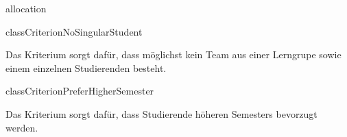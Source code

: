 \begin{texdocpackage}{allocation}
\begin{texdocclass}{class}{CriterionNoSingularStudent}
\label{texdoclet:allocation.CriterionNoSingularStudent}
\begin{texdocclassintro}
Das Kriterium sorgt dafür, dass möglichst kein Team aus einer Lerngrupe sowie
 einem einzelnen Studierenden besteht.\end{texdocclassintro}
\begin{texdocclassconstructors}
\end{texdocclassconstructors}
\begin{texdocclassmethods}
\end{texdocclassmethods}
\end{texdocclass}


\begin{texdocclass}{class}{CriterionPreferHigherSemester}
\label{texdoclet:allocation.CriterionPreferHigherSemester}
\begin{texdocclassintro}
Das Kriterium sorgt dafür, dass Studierende höheren Semesters bevorzugt
 werden.\end{texdocclassintro}
\begin{texdocclassconstructors}
\end{texdocclassconstructors}
\begin{texdocclassmethods}
\end{texdocclassmethods}
\end{texdocclass}



\end{texdocpackage}

